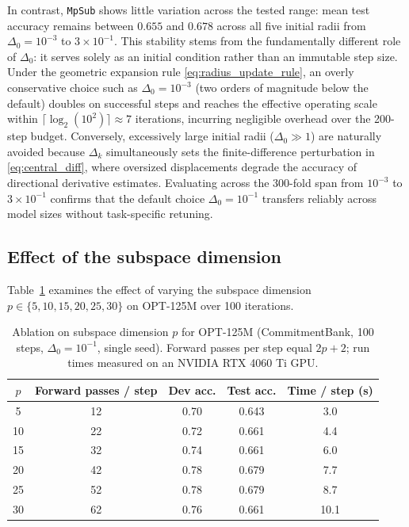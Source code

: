 \documentclass[smallextended]{svjour3}
\begin{document}
In contrast, \texttt{MpSub} shows little variation across the tested range: mean test accuracy remains between $0.655$ and $0.678$ across all five initial radii from $\Delta_0 = 10^{-3}$ to $3\times 10^{-1}$. This stability stems from the fundamentally different role of $\Delta_0$: it serves solely as an initial condition rather than an immutable step size. Under the geometric expansion rule \eqref{eq:radius_update_rule}, an overly conservative choice such as $\Delta_0 = 10^{-3}$ (two orders of magnitude below the default) doubles on successful steps and reaches the effective operating scale within $\lceil \log_2(10^2) \rceil \approx 7$ iterations, incurring negligible overhead over the 200-step budget. Conversely, excessively large initial radii ($\Delta_0 \gg 1$) are naturally avoided because $\Delta_k$ simultaneously sets the finite-difference perturbation in \eqref{eq:central_diff}, where oversized displacements degrade the accuracy of directional derivative estimates. Evaluating across the 300-fold span from $10^{-3}$ to $3\times 10^{-1}$ confirms that the default choice $\Delta_0 = 10^{-1}$ transfers reliably across model sizes without task-specific retuning.

\subsection{Effect of the subspace dimension}
\label{subsec:p_ablation}

Table~\ref{tab:p_ablation} examines the effect of varying the subspace dimension $p \in \{5, 10, \allowbreak 15, \allowbreak 20, \allowbreak 25, \allowbreak 30\}$ on OPT-125M over 100 iterations.

\begin{table}[htb]
\centering
\caption{Ablation on subspace dimension $p$ for OPT-125M (CommitmentBank, 100 steps, $\Delta_0 = 10^{-1}$, single seed). Forward passes per step equal $2p+2$; run times measured on an NVIDIA RTX 4060 Ti GPU.}
\label{tab:p_ablation}
\small
\begin{tabular}{ccccc}
\toprule
$p$ & Forward passes / step & Dev acc. & Test acc. & Time / step (s) \\
\midrule
5  & 12 & 0.70 & 0.643 & 3.0 \\
10 & 22 & 0.72 & 0.661 & 4.4 \\
15 & 32 & 0.74 & 0.661 & 6.0 \\
20 & 42 & 0.78 & 0.679 & 7.7 \\
25 & 52 & 0.78 & 0.679 & 8.7 \\
30 & 62 & 0.76 & 0.661 & 10.1 \\
\bottomrule
\end{tabular}
\end{table}
\end{document}

